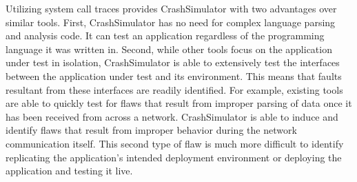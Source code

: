     Utilizing system call traces provides CrashSimulator with two advantages over similar tools. First,
    CrashSimulator has no need for complex language parsing and analysis code. It can test an application regardless
    of the programming language it was written in. Second, while other tools focus on the application under test in
    isolation, CrashSimulator is able to extensively test the interfaces between the application under test and its
    environment. This means that faults resultant from these interfaces are readily identified. For example,
    existing tools are able to quickly test for flaws that result from improper parsing of data once it
    has been received from across a network. CrashSimulator is able to induce and identify flaws that result from
    improper behavior during the network communication itself. This second type of flaw is much more difficult to
    identify replicating the application's intended deployment environment or deploying the application and testing
    it live.
